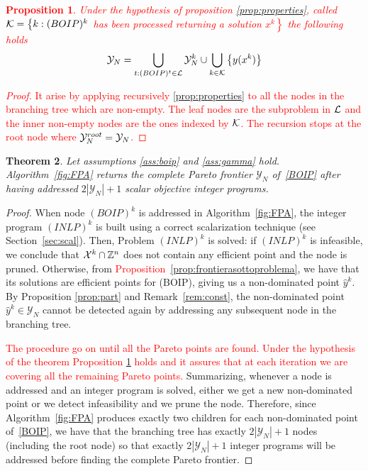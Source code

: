 \documentclass[preprint,12pt]{elsarticle}
\newcommand{\red}[1]{\textcolor{red}{#1}}
\newtheorem{theorem}{Theorem}[section]
\newtheorem{proposition}[theorem]{Proposition}
\def\X{{\cal X}}
\def\Z{\mathbb{Z}}
\begin{document}
\red{
\begin{proposition}\label{prop:nest}
 Under the hypothesis of proposition \ref{prop:properties}, called ${\cal K} = \left\{  k : (BOIP)^k \right.$ has been processed returning a solution $\left. x^k \right\}$  the following holds
 $${\cal Y}_N =    \bigcup_{t : (BOIP)^t \in {\cal L}} {\cal Y}^k_N \cup \bigcup_{k \in {\cal K}} \left\{ y (x^k) \right\}$$
\end{proposition}
}

\red{
\begin{proof}
It arise by applying recursively \ref{prop:properties} to all the nodes in the branching tree which are non-empty. The leaf nodes are the subproblem in $\cal L$ and the inner non-empty nodes are the ones indexed by $\cal K$. The recursion stops at the root node where ${\cal Y}_N^{root} = {\cal Y}_N$.
\end{proof}
}



\begin{theorem}\label{theo: convergence}
Let assumptions \ref{ass:boip} and \ref{ass:gamma} hold.
 Algorithm~\ref{fig:FPA} returns the complete Pareto frontier $\mathcal{Y}_N$ of~\eqref{BOIP} after having addressed
$2|\mathcal{Y}_N|+1$ scalar objective integer programs.
\end{theorem}
\begin{proof}
When node $(BOIP)^k$ is addressed in Algorithm~\ref{fig:FPA}, the integer program $(INLP)^k$ is built
using  a correct
scalarization technique (see Section~\ref{sec:scal}).
Then, Problem $(INLP)^k$ is solved: if $(INLP)^k$ is infeasible, we conclude that $\X^k\cap \Z^n$ does not contain any efficient point and the node is pruned.
Otherwise, from\red{ Proposition~\ref{prop:frontierasottoproblema}}, we have that its solutions are efficient points for (BOIP), giving us a non-dominated point $\hat y^k$.
By Proposition \ref{prop:part} and Remark~\ref{rem:const}, the non-dominated point $\hat y^k\in \mathcal{Y}_N$ cannot be detected again by
addressing any subsequent node in the branching tree.

\red{The procedure go on until all the Pareto points are found. Under the hypothesis of the theorem Proposition \ref{prop:nest} holds and it assures that at each iteration we are covering all the remaining Pareto points.}
Summarizing, whenever a node is addressed and an integer program is solved, either we get a new non-dominated point or we detect infeasibility
and we prune the node.
Therefore, since Algorithm~\ref{fig:FPA} produces exactly two children for each non-dominated point of~\eqref{BOIP},
we have that the branching tree has exactly  $2|\mathcal{Y}_N|+1$ nodes (including the root node) so that exactly  $2|\mathcal{Y}_N|+1$  integer programs will be addressed before finding the complete Pareto frontier.
\end{proof}
\end{document}
